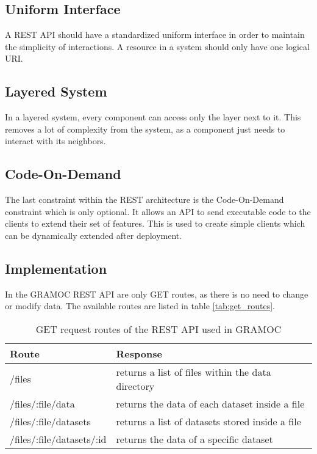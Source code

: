 \subsection{Uniform Interface}
A REST API should have a standardized uniform interface in order to maintain the simplicity of interactions. A resource in a system should only have one logical URI.

\subsection{Layered System}
In a layered system, every component can access only the layer next to it. This removes a lot of complexity from the system, as a component just needs to interact with its neighbors.

\subsection{Code-On-Demand}
The last constraint within the REST architecture is the Code-On-Demand constraint which is only optional. It allows an API to send executable code to the clients to extend their set of features. This is used to create simple clients which can be dynamically extended after deployment.

\subsection{Implementation}
In the GRAMOC REST API are only GET routes, as there is no need to change or modify data. The available routes are listed in table \vref{tab:get_routes}.

\begin{table}[H]
    \centering
    \begin{tabular}{| l | l |}
    \hline
    \textbf{Route} & \textbf{Response} \\ \hline
    /files & returns a list of files within the data directory \\ \hline
    /files/:file/data & returns the data of each dataset inside a file \\ \hline
    /files/:file/datasets & returns a list of datasets stored inside a file \\ \hline
    /files/:file/datasets/:id & returns the data of a specific dataset \\
    \hline
    \end{tabular}
    \caption{GET request routes of the REST API used in GRAMOC}
    \label{tab:get_routes}
\end{table}

